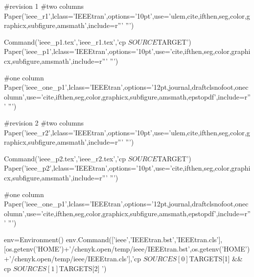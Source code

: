 \begin{itemize}[leftmargin=2em, label={\textbf{·}}]
#revision 1
#two columns
Paper('ieee_r1',lclass='IEEEtran',options='10pt',use='ulem,cite,ifthen,seg,color,graphicx,subfigure,amsmath',include=r'''
\DeclareRobustCommand{\old}[1]{\color{blue}{\sout{#1}}\color{black}{}}
\DeclareRobustCommand{\new}[1]{\color{red}{\textit{#1}}\color{black}{}} 
''')

Command('ieee_p1.tex','ieee_r1.tex','cp $SOURCE $TARGET')
Paper('ieee_p1',lclass='IEEEtran',options='10pt',use='cite,ifthen,seg,color,graphicx,subfigure,amsmath',include=r'''
\DeclareRobustCommand{\old}[1]{}
\DeclareRobustCommand{\new}[1]{#1}
''')

#one column
Paper('ieee_one_p1',lclass='IEEEtran',options='12pt,journal,draftclsnofoot,onecolumn',use='cite,ifthen,seg,color,graphicx,subfigure,amsmath,epstopdf',include=r'''
\DeclareRobustCommand{\old}[1]{}
\DeclareRobustCommand{\new}[1]{#1}
\DeclareRobustCommand{\dlo}[1]{}
\DeclareRobustCommand{\wen}[1]{#1}
''')


#revision 2
#two columns
Paper('ieee_r2',lclass='IEEEtran',options='10pt',use='ulem,cite,ifthen,seg,color,graphicx,subfigure,amsmath',include=r'''
\DeclareRobustCommand{\dlo}[1]{}
\DeclareRobustCommand{\wen}[1]{#1}
\DeclareRobustCommand{\old}[1]{\color{blue}{\sout{#1}}\color{black}{}}
\DeclareRobustCommand{\new}[1]{\color{red}{\textit{#1}}\color{black}{}} 
''')

Command('ieee_p2.tex','ieee_r2.tex','cp $SOURCE $TARGET')
Paper('ieee_p2',lclass='IEEEtran',options='10pt',use='cite,ifthen,seg,color,graphicx,subfigure,amsmath',include=r'''
\DeclareRobustCommand{\dlo}[1]{}
\DeclareRobustCommand{\wen}[1]{#1}
\DeclareRobustCommand{\old}[1]{}
\DeclareRobustCommand{\new}[1]{#1}
''')

#one column
Paper('ieee_one_p1',lclass='IEEEtran',options='12pt,journal,draftclsnofoot,onecolumn',use='cite,ifthen,seg,color,graphicx,subfigure,amsmath,epstopdf',include=r'''
\DeclareRobustCommand{\old}[1]{}
\DeclareRobustCommand{\new}[1]{#1}
\DeclareRobustCommand{\dlo}[1]{}
\DeclareRobustCommand{\wen}[1]{#1}
''')

env=Environment()
env.Command(['ieee','IEEEtran.bst','IEEEtran.cls'],[os.getenv('HOME')+'/chenyk.open/temp/ieee/IEEEtran.bst',os.getenv('HOME')+'/chenyk.open/temp/ieee/IEEEtran.cls'],'cp  ${SOURCES[0]}  ${TARGETS[1]} && cp  ${SOURCES[1]}  ${TARGETS[2]} ')


\DeclareRobustCommand{\refname}{10 References/Works Cited}




\end{itemize}
